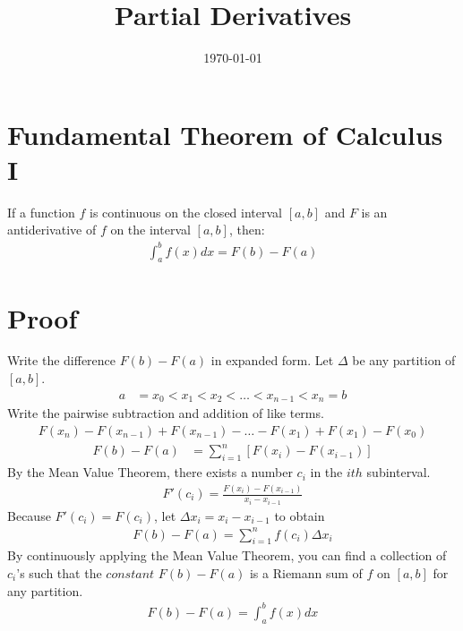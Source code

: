 \documentclass[a4paper, 12pt]{article}
\begin{document}
\title{Partial Derivatives}
\date{\today}
\pagestyle{empty} 
\section{Fundamental Theorem of Calculus I}
	If a function $f$ is continuous on the closed interval $[a, b]$ and $F$ is an antiderivative of $f$ on the interval $[a, b]$, then:
\begin{align}
	\int_a^b f(x) dx = F(b) - F(a)
\end{align}
\section{Proof}
	Write the difference $F(b) - F(a)$ in expanded form.  Let $\Delta$ be any partition of $[a, b]$.
\begin{align*}
	a &= x_0 < x_1 < x_2 < \ldots < x_{n-1} < x_n = b
\end{align*}
	Write the pairwise subtraction and addition of like terms.
\begin{align*}
	F(x_n) - F(x_{n-1}) + F(x_{n-1}) - \ldots - F(x_1) + F(x_1) - F(x_0)	
\end{align*}
\begin{align}
	F(b) - F(a) &= \displaystyle\sum_{i=1}^{n} [F(x_i) - F(x_{i-1})]
\end{align}
	By the Mean Value Theorem, there exists a number $c_i$ in the $ith$ subinterval.
\begin{align*}
	F'(c_i) = \frac{F(x_i) - F(x_{i-1})}{x_i - x_{i-1}}
\end{align*}	
	Because $F'(c_i) = F(c_i)$, let $\Delta x_i = x_i - x_{i-1}$ to obtain
\begin{align}
	F(b) - F(a) = \displaystyle\sum_{i=1}^{n} f(c_i) \Delta x_i
\end{align}
	By continuously applying the Mean Value Theorem, you can find a collection of $c_i$'s such that the $constant$ $F(b) - F(a)$ is a Riemann sum of $f$ on $[a, b]$ for any partition.  	
\begin{align*}
	F(b) - F(a) = \int_a^b f(x) dx 
\end{align*}
\end{document}
